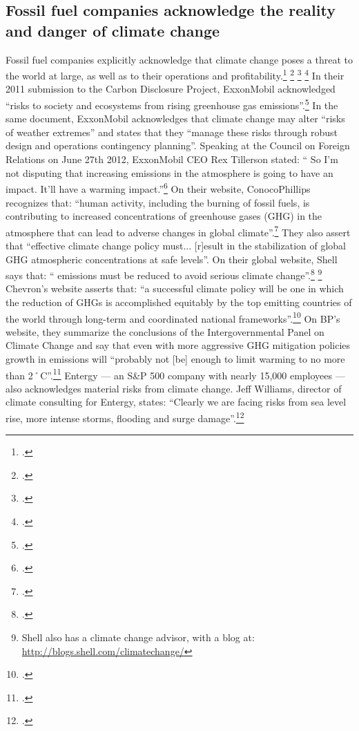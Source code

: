	\subsection{Fossil fuel companies acknowledge the reality and danger of climate change}




	

Fossil fuel companies explicitly acknowledge that climate change poses a threat to the world at large, as well as to their operations and profitability.\footcite[][]{FFcorpsPlanning} \footcite[][]{OilCosFearFI} \footcite[][]{DemiseOfCrudeDenial} \footcite[][]{DoTheOpposite}
In their 2011 submission to the Carbon Disclosure Project, ExxonMobil acknowledged ``risks to society and ecosystems from rising greenhouse gas emissions''.\footcite[][]{ExxonCDP2011}
In the same document, ExxonMobil acknowledges that climate change may alter ``risks of weather extremes'' and states that they ``manage these risks through robust design and operations contingency planning''.
Speaking at the Council on Foreign Relations on June 27th 2012, ExxonMobil CEO Rex Tillerson stated: `` So I'm not disputing that increasing  emissions in the atmosphere is going to have an impact. It'll have a warming impact.''\footcite[][]{Tillerson}
On their website, ConocoPhillips recognizes that: ``human activity, including the burning of fossil fuels, is contributing to increased concentrations of greenhouse gases (GHG) in the atmosphere that can lead to adverse changes in global climate''.\footcite[][]{ConocoPhillipsCC}
They also assert that ``effective climate change policy must... [r]esult in the stabilization of global GHG atmospheric concentrations at safe levels''.
On their global website, Shell says that: `` emissions must be reduced to avoid serious climate change''.\footcite[][]{ShellClimateChange} \footnote{Shell also has a climate change advisor, with a blog at: \url{http://blogs.shell.com/climatechange/}}
Chevron's website asserts that: ``a successful climate policy will be one in which the reduction of GHGs is accomplished equitably by the top emitting countries of the world through long-term and coordinated national frameworks''.\footcite[][]{}
On BP's website, they summarize the conclusions of the Intergovernmental Panel on Climate Change and say that even with more aggressive GHG mitigation policies growth in  emissions will ``probably not [be] enough to limit warming to no more than 2˚C''.\footcite[][]{BPClimateChange}
Entergy --- an S\&P 500 company with nearly 15,000 employees --- also acknowledges material risks from climate change.
Jeff Williams, director of climate consulting for Entergy, states: ``Clearly we are facing risks from sea level rise, more intense storms, flooding and surge damage''.\footcite[][]{ShiftToClimatePreparedness}


